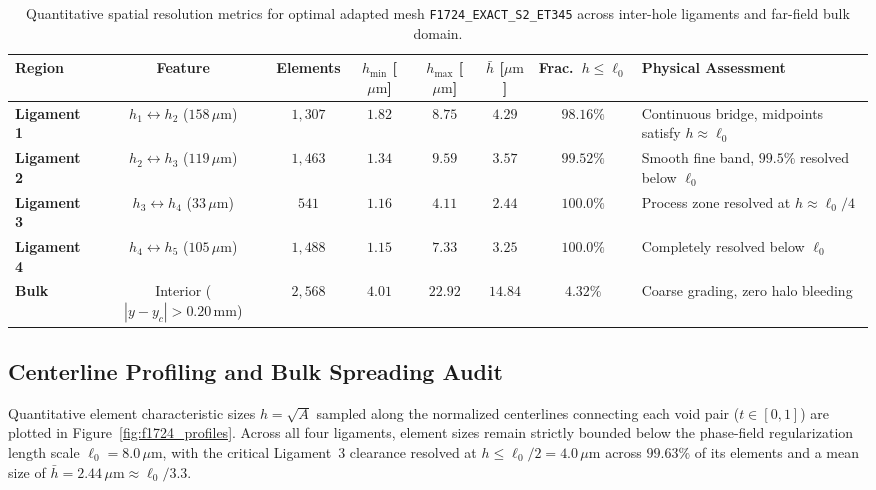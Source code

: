 \begin{table}[htbp]
\centering
\caption{Quantitative spatial resolution metrics for optimal adapted mesh \texttt{F1724\_EXACT\_S2\_ET345} across inter-hole ligaments and far-field bulk domain.}
\label{tab:f1724_resolution_audit}
\footnotesize
\begin{tabular}{l c c c c c c l}
\toprule
\textbf{Region} & \textbf{Feature} & \textbf{Elements} & $h_{\min}$ [$\mu\mathrm{m}$] & $h_{\max}$ [$\mu\mathrm{m}$] & $\bar{h}$ [$\mu\mathrm{m}$] & \textbf{Frac.~$h \le \ell_0$} & \textbf{Physical Assessment} \\
\midrule
\textbf{Ligament 1} & $h_1 \leftrightarrow h_2$ ($158\,\mu\mathrm{m}$) & $1{,}307$ & $1.82$ & $8.75$ & $4.29$ & $98.16\%$ & Continuous bridge, midpoints satisfy $h \approx \ell_0$ \\
\textbf{Ligament 2} & $h_2 \leftrightarrow h_3$ ($119\,\mu\mathrm{m}$) & $1{,}463$ & $1.34$ & $9.59$ & $3.57$ & $99.52\%$ & Smooth fine band, $99.5\%$ resolved below $\ell_0$ \\
\textbf{Ligament 3} & $h_3 \leftrightarrow h_4$ ($33\,\mu\mathrm{m}$)  & $541$   & $1.16$ & $4.11$ & $2.44$ & $100.0\%$ & Process zone resolved at $h \approx \ell_0/4$ \\
\textbf{Ligament 4} & $h_4 \leftrightarrow h_5$ ($105\,\mu\mathrm{m}$) & $1{,}488$ & $1.15$ & $7.33$ & $3.25$ & $100.0\%$ & Completely resolved below $\ell_0$ \\
\textbf{Bulk}       & Interior ($|y - y_c| > 0.20\,\mathrm{mm}$) & $2{,}568$ & $4.01$ & $22.92$ & $14.84$ & $4.32\%$ & Coarse grading, zero halo bleeding \\
\bottomrule
\end{tabular}
\end{table}

\subsection{Centerline Profiling and Bulk Spreading Audit}
\label{subsec:f1724_profiles_and_bulk}

Quantitative element characteristic sizes $h = \sqrt{A}$ sampled along the normalized centerlines connecting each void pair ($t \in [0, 1]$) are plotted in Figure~\ref{fig:f1724_profiles}. Across all four ligaments, element sizes remain strictly bounded below the phase-field regularization length scale $\ell_0 = 8.0\,\mu\mathrm{m}$, with the critical Ligament~3 clearance resolved at $h \le \ell_0/2 = 4.0\,\mu\mathrm{m}$ across $99.63\%$ of its elements and a mean size of $\bar{h} = 2.44\,\mu\mathrm{m} \approx \ell_0/3.3$.

